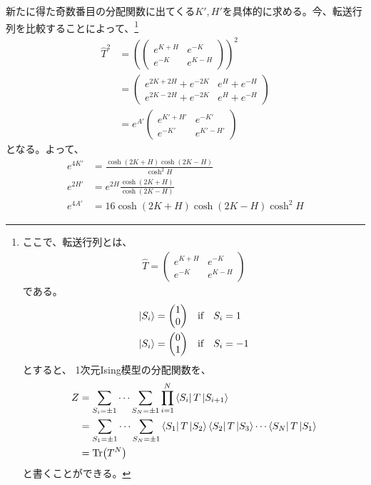 \documentclass[a4paper,11pt]{jsarticle}
\numberwithin{equation}{section}
\begin{document}
新たに得た奇数番目の分配関数に出てくる$K',H'$を具体的に求める。今、転送行列を比較することによって、\footnote{
    ここで、転送行列とは、
    \begin{align}
        \hat{T} = 
        \begin{pmatrix}
            e^{K+H} & e^{-K} \\
            e^{-K} & e^{K-H}
        \end{pmatrix}
    \end{align}
    である。
    \begin{align}
        \ket{S_i} &= \mqty(1\\0) \quad \text{if} \quad S_i = 1\\
        \ket{S_i} &= \mqty(0\\1) \quad \text{if} \quad S_i = -1
    \end{align}
    とすると、
    1次元Ising模型の分配関数を、
    \begin{align}
        Z &= \sum_{S_i = \pm 1} \cdots \sum_{S_N = \pm 1} \prod_{i=1}^{N} \bra{S_i}T\ket{S_{i+1}}\\
        &= \sum_{S_1 = \pm 1} \cdots \sum_{S_N = \pm 1} \bra{S_1}T\ket{S_2}\bra{S_2}T\ket{S_3}\cdots\bra{S_N}T\ket{S_1}\\
        &= \Tr(T^N)
    \end{align}
    と書くことができる。
}
\begin{align}
    \hat{T}^2 &= 
\left( 
\begin{pmatrix}
e^{K+H} & e^{-K} \\
e^{-K} & e^{K-H}
\end{pmatrix}
\right)^2 
\\
&=
\begin{pmatrix}
e^{2K+2H} + e^{-2K} & e^{H} + e^{-H} \\
e^{2K-2H} + e^{-2K} & e^{H} + e^{-H}
\end{pmatrix}
\\
&=
e^{A'}
\begin{pmatrix}
e^{K'+H'} & e^{-K'} \\
e^{-K'} & e^{K'-H'}
\end{pmatrix}
\end{align}
となる。よって、
\begin{align}
    e^{4K'} &= \frac{\cosh(2K+H) \cosh(2K-H)}{\cosh^2 H}\\
    e^{2H'} &= e^{2H} \frac{\cosh(2K+H)}{\cosh(2K-H)}\\
    e^{4A'} &= 16 \cosh(2K+H) \cosh(2K-H) \cosh^2 H
\end{align}
\end{document}
